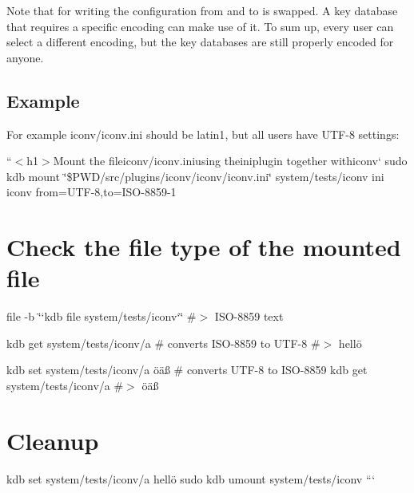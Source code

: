 Note that for writing the configuration {\ttfamily from} and {\ttfamily to} is swapped. A key database that requires a specific encoding can make use of it. To sum up, every user can select a different encoding, but the key databases are still properly encoded for anyone.

\subsection*{Example}

For example {\ttfamily iconv/iconv.\+ini} should be {\ttfamily latin1}, but all users have {\ttfamily U\+T\+F-\/8} settings\+:

``{\ttfamily  $<$h1$>$Mount the file}iconv/iconv.\+ini{\ttfamily using the}ini{\ttfamily plugin together with}iconv` sudo kdb mount \char`\"{}\$\+P\+W\+D/src/plugins/iconv/iconv/iconv.\+ini\char`\"{} system/tests/iconv ini iconv from=U\+T\+F-\/8,to=I\+S\+O-\/8859-\/1

\section*{Check the file type of the mounted file}

file -\/b \char`\"{}`kdb file system/tests/iconv`\char`\"{} \#$>$ I\+S\+O-\/8859 text

kdb get system/tests/iconv/a \# converts I\+S\+O-\/8859 to U\+T\+F-\/8 \#$>$ hellö

kdb set system/tests/iconv/a öäß \# converts U\+T\+F-\/8 to I\+S\+O-\/8859 kdb get system/tests/iconv/a \#$>$ öäß

\section*{Cleanup}

kdb set system/tests/iconv/a hellö sudo kdb umount system/tests/iconv ``` 